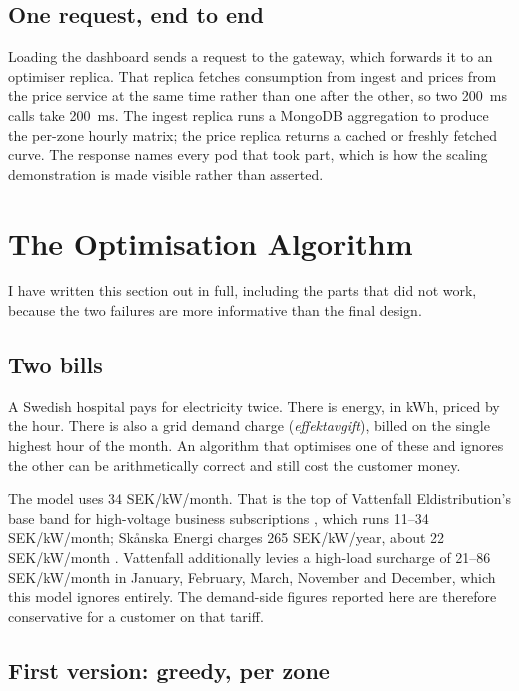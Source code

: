 \documentclass[conference]{IEEEtran}
\begin{document}
\subsection{One request, end to end}

Loading the dashboard sends a request to the gateway, which forwards it to an
optimiser replica. That replica fetches consumption from ingest and prices from
the price service at the same time rather than one after the other, so two
200~ms calls take 200~ms. The ingest replica runs a MongoDB aggregation to
produce the per-zone hourly matrix; the price replica returns a cached or
freshly fetched curve. The response names every pod that took part, which is how
the scaling demonstration is made visible rather than asserted.

\section{The Optimisation Algorithm}
\label{sec:algorithm}

I have written this section out in full, including the parts that did not work,
because the two failures are more informative than the final design.

\subsection{Two bills}

A Swedish hospital pays for electricity twice. There is energy, in kWh, priced
by the hour. There is also a grid demand charge (\emph{effektavgift}), billed on
the single highest hour of the month. An algorithm that optimises one of these
and ignores the other can be arithmetically correct and still cost the customer
money.

The model uses 34 SEK/kW/month. That is the top of Vattenfall Eldistribution's
base band for high-voltage business subscriptions \cite{vattenfall2025}, which
runs 11--34 SEK/kW/month; Sk\aa nska Energi charges 265 SEK/kW/year, about 22
SEK/kW/month \cite{skanska2026}. Vattenfall additionally levies a high-load
surcharge of 21--86 SEK/kW/month in January, February, March, November and
December, which this model ignores entirely. The demand-side figures reported
here are therefore conservative for a customer on that tariff.

\subsection{First version: greedy, per zone}
\end{document}
